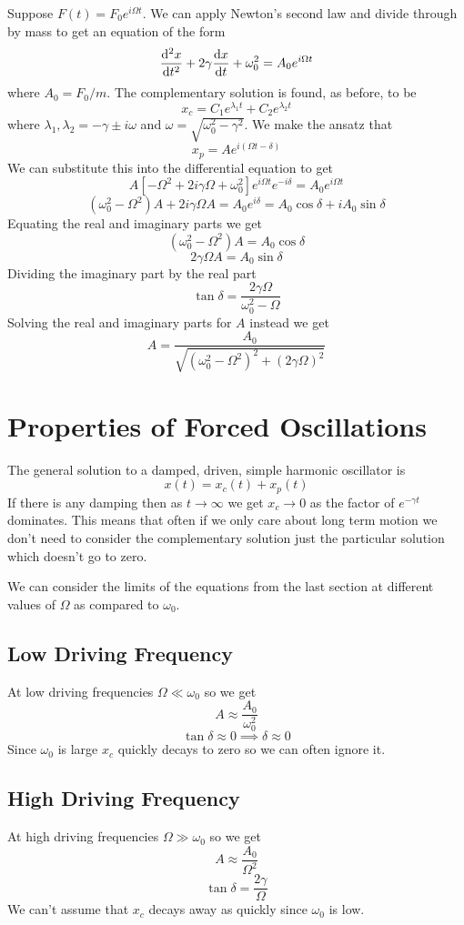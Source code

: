 \documentclass{article}
\begin{document}
    \example
    Suppose \(F(t) = F_0e^{i\Omega t}\).
    We can apply Newton's second law and divide through by mass to get an equation of the form
    \[\dv[2]{x}{t} + 2\gamma\dv{x}{t} + \omega_0^2 = A_0e^{i\Omega t}\]
    where \(A_0 = F_0/m\).
    The complementary solution is found, as before, to be
    \[x_c = C_1e^{\lambda_1 t} + C_2e^{\lambda_2 t}\]
    where \(\lambda_{1},\lambda_2 = -\gamma\pm i\omega\) and \(\omega = \sqrt{\omega_0^2 - \gamma^2}\).
    We make the ansatz that
    \[x_p = Ae^{i(\Omega t - \delta)}\]
    We can substitute this into the differential equation to get
    \[A[-\Omega^2 + 2i\gamma\Omega + \omega_0^2]e^{i\Omega t}e^{-i\delta} = A_0e^{i\Omega t}\]
    \[(\omega_0^2 - \Omega^2)A + 2i\gamma\Omega A = A_0e^{i\delta} = A_0\cos\delta + iA_0\sin\delta\]
    Equating the real and imaginary parts we get
    \[(\omega_0^2 - \Omega^2)A = A_0\cos\delta\]
    \[2\gamma\Omega A = A_0\sin\delta\]
    Dividing the imaginary part by the real part
    \[\tan\delta = \frac{2\gamma\Omega}{\omega_0^2 - \Omega}\]
    Solving the real and imaginary parts for \(A\) instead we get
    \[A = \frac{A_0}{\sqrt{(\omega_0^2 - \Omega^2)^2 + (2\gamma\Omega)^2}}\]
    
    \section{Properties of Forced Oscillations}
    The general solution to a damped, driven, simple harmonic oscillator is
    \[x(t) = x_c(t) + x_p(t)\]
    If there is any damping then as \(t\to\infty\) we get \(x_c\to 0\) as the factor of \(e^{-\gamma t}\) dominates.
    This means that often if we only care about long term motion we don't need to consider the complementary solution just the particular solution which doesn't go to zero.
    
    We can consider the limits of the equations from the last section at different values of \(\Omega\) as compared to \(\omega_0\).
    
    \subsection{Low Driving Frequency}
    At low driving frequencies \(\Omega \ll \omega_0\) so we get
    \[A\approx\frac{A_0}{\omega_0^2}\]
    \[\tan\delta \approx 0\implies\delta\approx 0\]
    Since \(\omega_0\) is large \(x_c\) quickly decays to zero so we can often ignore it.
    
    \subsection{High Driving Frequency}
    At high driving frequencies \(\Omega \gg \omega_0\) so we get
    \[A\approx\frac{A_0}{\Omega^2}\]
    \[\tan\delta = \frac{2\gamma}{\Omega}\]
    We can't assume that \(x_c\) decays away as quickly since \(\omega_0\) is low.
    
\end{document}
